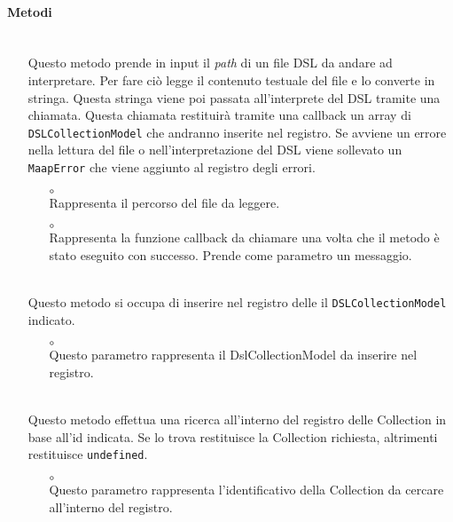 \paragraph*{Metodi}
\begin{itemize}
\item[]  \\ Questo metodo prende in input il \textit{path} di un file DSL da andare ad interpretare. Per fare ciò legge il contenuto testuale del file e lo converte in stringa. Questa stringa viene poi passata all'interprete del DSL tramite una chiamata. Questa chiamata restituirà tramite una callback un array di \texttt{DSLCollectionModel} che andranno inserite nel registro. Se avviene un errore nella lettura del file o nell'interpretazione del DSL viene sollevato un \texttt{MaapError} che viene aggiunto al registro degli errori.
\begin{itemize}\addtolength{\itemsep}{-0.5\baselineskip}
\item[$\circ$]  \\ Rappresenta il percorso del file da leggere.
\item[$\circ$]  \\ Rappresenta la funzione callback da chiamare una volta che il metodo è stato eseguito con successo. Prende come parametro un messaggio.
\end{itemize}
\item[]  \\ Questo metodo si occupa di inserire nel registro delle  il \texttt{DSLCollectionModel} indicato.
\begin{itemize}\addtolength{\itemsep}{-0.5\baselineskip}
\item[$\circ$]  \\ Questo parametro rappresenta il DslCollectionModel da inserire nel registro.
\end{itemize}
\item[]  \\ Questo metodo effettua una ricerca all'interno del registro delle Collection in base all'id indicata. Se lo trova restituisce la Collection richiesta, altrimenti restituisce \texttt{undefined}.
\begin{itemize}\addtolength{\itemsep}{-0.5\baselineskip}
\item[$\circ$]  \\ Questo parametro rappresenta l'identificativo della Collection da cercare all'interno del registro.

\end{itemize}
\end{itemize}

